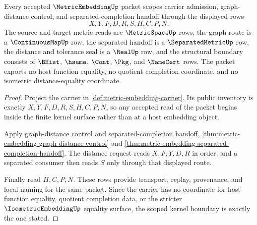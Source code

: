 \begin{theorem}
\label{thm:metric-embedding-kernel-scope}
Every accepted $\MetricEmbeddingUp$ packet scopes carrier admission, graph-distance control, and separated-completion handoff through the displayed rows
$$
X,Y,F,D,R,S,H,C,P,N .
$$
The source and target metric reads are $\MetricSpaceUp$ rows, the graph route is a $\ContinuousMapUp$ row, the separated handoff is a $\SeparatedMetricUp$ row, the distance and tolerance seal is a $\RealUp$ row, and the structural boundary consists of $\BHist$, $\hsame$, $\Cont$, $\Pkg$, and $\NameCert$ rows. The packet exports no host function equality, no quotient completion coordinate, and no isometric distance-equality coordinate.
\end{theorem}
\begin{proof}
Project the carrier in \autoref{def:metric-embedding-carrier}. Its public inventory is exactly $X,Y,F,D,R,S,H,C,P,N$, so any accepted read of the packet begins inside the finite kernel surface rather than at a host embedding object.

Apply graph-distance control and separated-completion handoff, \autoref{thm:metric-embedding-graph-distance-control} and \autoref{thm:metric-embedding-separated-completion-handoff}. The distance request reads $X,F,Y,D,R$ in order, and a separated consumer then reads $S$ only through that displayed route.

Finally read $H,C,P,N$. These rows provide transport, replay, provenance, and local naming for the same packet. Since the carrier has no coordinate for host function equality, quotient completion data, or the stricter $\IsometricEmbeddingUp$ equality surface, the scoped kernel boundary is exactly the one stated.
\end{proof}

